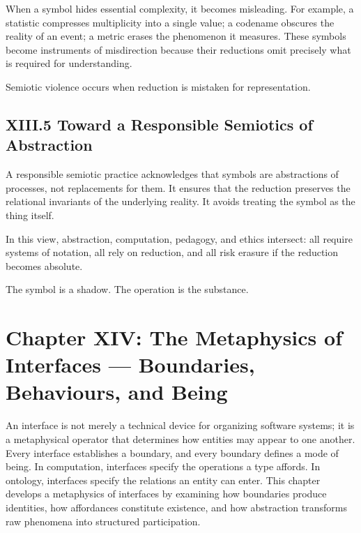 \documentclass[12pt,letterpaper]{article}
\begin{document}
When a symbol hides essential complexity, it becomes misleading. For example, a statistic compresses multiplicity into a single value; a codename obscures the reality of an event; a metric erases the phenomenon it measures. These symbols become instruments of misdirection because their reductions omit precisely what is required for understanding.

Semiotic violence occurs when reduction is mistaken for representation.

\subsection{XIII.5 Toward a Responsible Semiotics of Abstraction}

A responsible semiotic practice acknowledges that symbols are abstractions of processes, not replacements for them. It ensures that the reduction preserves the relational invariants of the underlying reality. It avoids treating the symbol as the thing itself.

In this view, abstraction, computation, pedagogy, and ethics intersect: all require systems of notation, all rely on reduction, and all risk erasure if the reduction becomes absolute.

The symbol is a shadow. The operation is the substance.

\newpage
\section{Chapter XIV: The Metaphysics of Interfaces — Boundaries, Behaviours, and Being}

An interface is not merely a technical device for organizing software systems; it is a metaphysical operator that determines how entities may appear to one another. Every interface establishes a boundary, and every boundary defines a mode of being. In computation, interfaces specify the operations a type affords. In ontology, interfaces specify the relations an entity can enter. This chapter develops a metaphysics of interfaces by examining how boundaries produce identities, how affordances constitute existence, and how abstraction transforms raw phenomena into structured participation.

\end{document}

